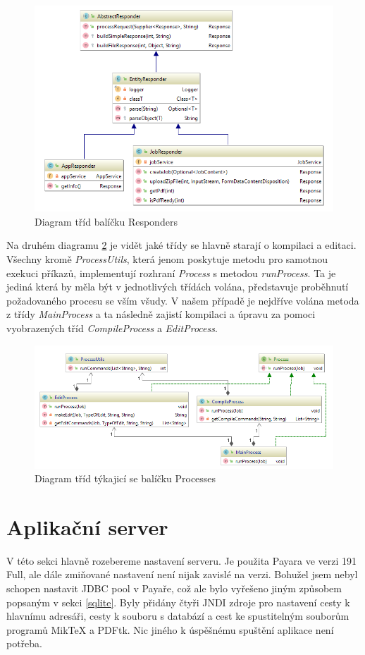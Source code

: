 \begin{figure}[H]
	\includegraphics[scale=0.7]{packageResp}
	\centering
	\caption{Diagram tříd balíčku Responders}
	\label{fig:packResp}
\end{figure}

Na druhém diagramu \ref{fig:packProc} je vidět jaké třídy se hlavně starají o kompilaci a editaci. Všechny kromě \textit{ProcessUtils}, která jenom poskytuje metodu pro samotnou exekuci příkazů, implementují rozhraní \textit{Process} s metodou \textit{runProcess}. Ta je jediná která by měla být v jednotlivých třídách volána, představuje proběhnutí požadovaného procesu se vším všudy. V našem případě je nejdříve volána metoda z třídy \textit{MainProcess} a ta následně zajistí kompilaci a úpravu za pomoci vyobrazených tříd \textit{CompileProcess} a \textit{EditProcess}.
\newpage
\begin{figure}[H]
	\includegraphics[scale=0.7]{packageProc}
	\centering
	\caption{Diagram tříd týkajicí se balíčku Processes}
	\label{fig:packProc}
\end{figure}


\section{Aplikační server}
V této sekci hlavně rozebereme nastavení serveru. Je použita Payara ve verzi 191 Full, ale dále zmiňované nastavení není nijak zavislé na verzi. Bohužel jsem nebyl schopen nastavit JDBC pool v Payaře, což ale bylo vyřešeno jiným způsobem popsaným v sekci \ref{sqlite}. Byly přidány čtyři JNDI zdroje pro nastavení cesty k hlavnímu adresáři, cesty k souboru s databází a cest ke spustitelným souborům programů MikTeX a PDFtk. Nic jiného k úspěšnému spuštění aplikace není potřeba.

